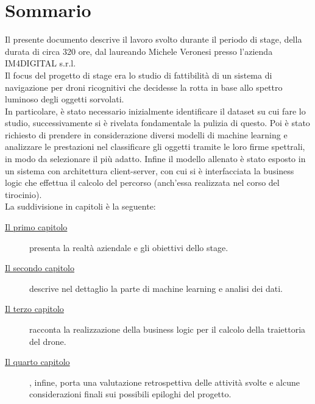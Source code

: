 
\cleardoublepage
{}
{}
\begingroup
\let\clearpage\relax
\let\cleardoublepage\relax
\let\cleardoublepage\relax

\chapter*{Sommario}

Il presente documento descrive il lavoro svolto durante il periodo di stage, della durata di circa 320 ore, dal laureando Michele Veronesi presso l'azienda IM4DIGITAL s.r.l.\\
Il focus del progetto di stage era lo studio di fattibilità di un sistema di navigazione per droni ricognitivi che decidesse la rotta in base allo spettro luminoso degli oggetti sorvolati.\\
In particolare, è stato necessario inizialmente identificare il dataset su cui fare lo studio, successivamente si è rivelata fondamentale la pulizia di questo.
Poi è stato richiesto di prendere in considerazione diversi modelli di machine learning e analizzare le prestazioni nel classificare gli oggetti tramite le loro firme spettrali,
in modo da selezionare il più adatto.
Infine il modello allenato è stato esposto in un sistema con architettura client-server, con cui si è interfacciata la business logic che effettua il calcolo del percorso (anch'essa realizzata nel corso del tirocinio).\\
La suddivisione in capitoli è la seguente:
\begin{description}
    \item[{\hyperref[cap:introduzione]{Il primo capitolo}}] presenta la realtà aziendale e gli obiettivi dello stage.
    
    \item[{\hyperref[cap:machine-learning]{Il secondo capitolo}}] descrive nel dettaglio la parte di machine learning e analisi dei dati.
    
    \item[{\hyperref[cap:business-logic]{Il terzo capitolo}}] racconta la realizzazione della business logic per il calcolo della traiettoria del drone.
    
    \item[{\hyperref[cap:conclusione]{Il quarto capitolo}}], infine, porta una valutazione retrospettiva delle attività svolte e alcune considerazioni finali sui possibili epiloghi del progetto.
\end{description}
%
%

\endgroup			

\vfill


